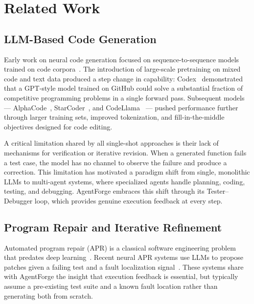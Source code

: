 
\section{Related Work}
\label{sec:related}

\subsection{LLM-Based Code Generation}

Early work on neural code generation focused on
sequence-to-sequence models trained on code
corpora~\cite{iyer2016summarizing,yin2017syntactic}.
The introduction of large-scale pretraining on
mixed code and text data produced a step change in
capability: Codex~\cite{chen2021codex} demonstrated
that a GPT-style model trained on GitHub could solve
a substantial fraction of competitive programming
problems in a single forward pass. Subsequent
models — AlphaCode~\cite{li2022alphacode},
StarCoder~\cite{li2023starcoder}, and
CodeLlama~\cite{roziere2023codellama} — pushed
performance further through larger training sets,
improved tokenization, and fill-in-the-middle
objectives designed for code editing.

A critical limitation shared by all single-shot
approaches is their lack of mechanisms for
verification or iterative revision. When a generated
function fails a test case, the model has no channel
to observe the failure and produce a correction.
This limitation has motivated a paradigm shift from
single, monolithic LLMs to multi-agent systems,
where specialized agents handle planning, coding,
testing, and debugging. AgentForge embraces this
shift through its Tester--Debugger loop, which
provides genuine execution feedback at every step.

\subsection{Program Repair and Iterative Refinement}

Automated program repair (APR) is a classical
software engineering problem that predates deep
learning~\cite{genprog,angelix,prophet}.
Recent neural APR systems use LLMs to propose
patches given a failing test and a fault
localization signal~\cite{xia2022less,
jin2023inferfix,fan2023automated}. These systems
share with AgentForge the insight that execution
feedback is essential, but typically assume a
pre-existing test suite and a known fault location
rather than generating both from scratch.

